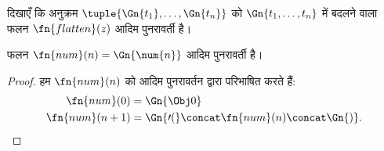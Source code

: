 \documentclass[../../../include/open-logic-section]{subfiles}
\begin{document}
\begin{prob}
दिखाएँ कि अनुक्रम $\tuple{\Gn{t_1}, \dots, \Gn{t_n}}$ को $\Gn{t_1, \dots,
t_n}$ में बदलने वाला फलन $\fn{flatten}(z)$ आदिम पुनरावर्ती है।
\end{prob}

\begin{prop}
  फलन $\fn{num}(n) = \Gn{\num{n}}$ आदिम पुनरावर्ती है।
\end{prop}

\begin{proof}
  हम $\fn{num}(n)$ को आदिम पुनरावर्तन द्वारा परिभाषित करते हैं:
  \begin{align*}
    \fn{num}(0) & = \Gn{\Obj 0}\\
    \fn{num}(n+1) & = \Gn{\prime(} \concat \fn{num}(n) \concat \Gn{)}.
  \end{align*}
\end{proof}
\end{document}
